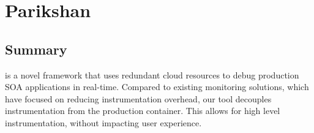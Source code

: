 \chapter{Parikshan}
\label{ch:parikshan}





\section{Summary}
\label{sec:parikshanSummary}

\parikshan is a novel framework that uses redundant cloud resources to debug production SOA applications in real-time.
Compared to existing monitoring solutions, which have focused on reducing instrumentation overhead, our tool decouples instrumentation from the production container.
This allows for high level instrumentation, without impacting user experience.







